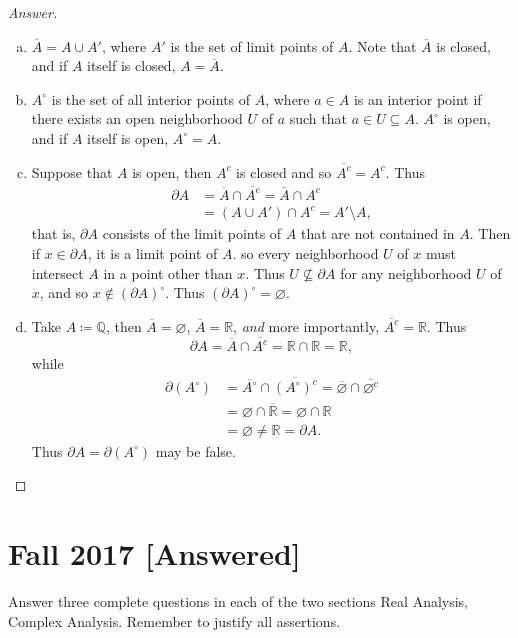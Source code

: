 \documentclass[12pt]{article}
\newcommand{\q}{\mathbb{Q}}
\newcommand{\real}{\mathbb{R}}
\newcommand{\ita}[1]{\textit{#1}}
\newcommand\paren[1]{\left( #1 \right)}
\theoremstyle{definition}
\begin{document}
\begin{proof}[Answer]
    \begin{enumerate}[(a)]
        \item $\overline{A} = A \cup A'$, where $A'$ is the set of limit points of $A$. Note that $\overline{A}$ is closed, and if $A$ itself is closed, $A = \overline{A}$. 
        \item $A^{\circ}$ is the set of all interior points of $A$, where $a \in A$ is an interior point if there exists an open neighborhood $U$ of $a$ such that $a \in U \subseteq A$. $A^{\circ}$ is open, and if $A$ itself is open, $A^{\circ} = A$.
        \item Suppose that $A$ is open, then $A^c$ is closed and so $\overline{A^c} = A^c$. Thus 
        \begin{align*}
            \partial A & = \overline{A} \cap \overline{A^c} = \overline{A} \cap A^c \\
            & = \paren{ A \cup A' } \cap A^c = A' \setminus A , 
        \end{align*}
        that is, $\partial A$ consists of the limit points of $A$ that are not contained in $A$. Then if $x \in \partial A$, it is a limit point of $A$. so every neighborhood $U$ of $x$ must intersect $A$ in a point other than $x$. Thus $U \not \subseteq \partial A$ for any neighborhood $U$ of $x$, and so $x \notin \paren{ \partial A }^{\circ}$. Thus $\paren{ \partial A }^{\circ} = \varnothing$. 
        \item Take $A \coloneqq \q$, then $\overline{A} = \varnothing$,  $\overline{A} = \real$, \ita{and} more importantly, $\overline{A^c} = \real$. Thus
        \[
            \partial A = \overline{A} \cap \overline{A^c} = \real \cap \real = \real , 
        \]
        while 
        \begin{align*}
            \partial \paren{ A^{\circ} } & = \overline{ A^{\circ} } \cap \overline{ \paren{ A^{\circ} }^c } = \overline{ \varnothing } \cap \overline{ \varnothing^c } \\ 
            & = \varnothing \cap \overline{\real} = \varnothing \cap \real \\ 
            & = \varnothing \neq \real = \partial A . 
        \end{align*}
        Thus $\partial A = \partial \paren{ A^{\circ} }$ may be false. 
    \end{enumerate}
\end{proof}

\newpage 
\section{Fall 2017 [Answered]}
Answer three complete questions in each of the two sections Real Analysis, Complex Analysis. Remember to justify all assertions. 
\end{document}
